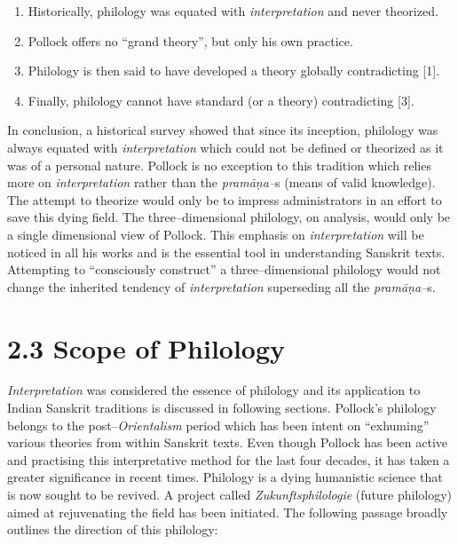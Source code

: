 \begin{enumerate}
\itemsep=0pt
\item Historically, philology was equated with \textit{interpretation} and never theorized.

 \item Pollock offers no “grand theory”, but only his own practice.

 \item Philology is then said to have developed a theory globally contradicting [1].

 \item Finally, philology cannot have standard (or a theory) contradicting [3].

\end{enumerate}

In conclusion, a historical survey showed that since its inception, philology was always equated with \textit{interpretation} which could not be defined or theorized as it was of a personal nature. Pollock is no exception to this tradition which relies more on \textit{interpretation} rather than the \textit{pramāṇa–}s (means of valid knowledge). The attempt to theorize would only be to impress administrators in an effort to save this dying field. The three–dimensional philology, on analysis, would only be a single dimensional view of Pollock. This emphasis on \textit{interpretation} will be noticed in all his works and is the essential tool in understanding Sanskrit texts. Attempting to “consciously construct” a three–dimensional philology would not change the inherited tendency of \textit{interpretation} superseding all the \textit{pramāṇa–}s.

\vspace{-.3cm}

\section*{2.3 Scope of Philology}

\textit{Interpretation} was considered the essence of philology and its application to Indian Sanskrit traditions is discussed in following sections. Pollock’s philology belongs to the post–\textit{Orientalism} period which has been intent on “exhuming” various theories from within Sanskrit texts. Even though Pollock has been active and practising this interpretative method for the last four decades, it has taken a greater significance in recent times. Philology is a dying humanistic science that is now sought to be revived. A project called \textit{Zukunftsphilologie} (future philology) aimed at rejuvenating the field has been initiated. The following passage broadly outlines the direction of this philology:

